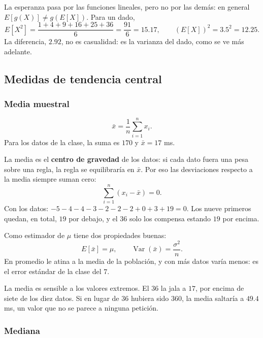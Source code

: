 \documentclass[11pt,letterpaper]{article}
\begin{document}
\begin{ojo}
    La esperanza pasa por las funciones lineales, pero no por las
    demás: en general $E[g(X)] \neq g(E[X])$. Para un dado,
    \[
        E[X^2] = \frac{1 + 4 + 9 + 16 + 25 + 36}{6} = \frac{91}{6}
               = 15.17 ,
        \qquad
        (E[X])^2 = 3.5^2 = 12.25 .
    \]
    La diferencia, $2.92$, no es casualidad: es la varianza del dado,
    como se ve más adelante.
\end{ojo}


\subsection*{Medidas de tendencia central}

\subsubsection*{Media muestral}

\[
    \bar{x} = \frac{1}{n} \sum_{i=1}^{n} x_i .
\]
Para los datos de la clase, la suma es $170$ y $\bar{x} = 17$ ms.

La media es el \textbf{centro de gravedad} de los datos: si cada dato
fuera una pesa sobre una regla, la regla se equilibraría en $\bar{x}$.
Por eso las desviaciones respecto a la media siempre suman cero:
\[
    \sum_{i=1}^{n} (x_i - \bar{x}) = 0 .
\]
Con los datos: $-5 - 4 - 4 - 3 - 2 - 2 - 2 + 0 + 3 + 19 = 0$. Los
nueve primeros quedan, en total, $19$ por debajo, y el $36$ solo los
compensa estando $19$ por encima.

Como estimador de $\mu$ tiene dos propiedades buenas:
\[
    E[\bar{x}] = \mu ,
    \qquad
    \operatorname{Var}(\bar{x}) = \frac{\sigma^2}{n} .
\]
En promedio le atina a la media de la población, y con más datos varía
menos: es el error estándar de la clase del $7$.

\begin{ojo}
    La media es sensible a los valores extremos. El $36$ la jala a
    $17$, por encima de siete de los diez datos. Si en lugar de $36$
    hubiera sido $360$, la media saltaría a $49.4$ ms, un valor que no
    se parece a ninguna petición.
\end{ojo}

\subsubsection*{Mediana}
\end{document}
